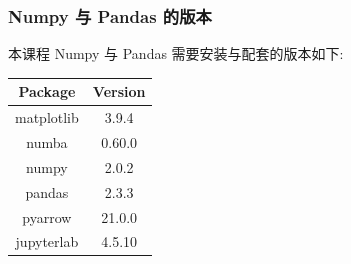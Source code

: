 \documentclass[11pt]{article}
\begin{document}
    \subsubsection{Numpy 与 Pandas
的版本}\label{numpy-ux4e0e-pandas-ux7684ux7248ux672c}

    本课程 Numpy 与 Pandas 需要安装与配套的版本如下:

{\def\LTcaptype{none} %
\begin{longtable}[]{@{}cc@{}}
\toprule\noalign{}
Package & Version \\
\midrule\noalign{}
\endhead
\bottomrule\noalign{}
\endlastfoot
matplotlib & 3.9.4 \\
numba & 0.60.0 \\
numpy & 2.0.2 \\
pandas & 2.3.3 \\
pyarrow & 21.0.0 \\
jupyterlab & 4.5.10 \\
\end{longtable}
}
\end{document}
